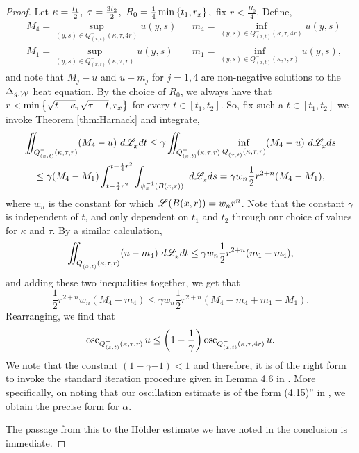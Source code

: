 \documentclass[a4paper, 12pt]{amsart}
\begin{document}
\begin{proof}
Let 
$\kappa = \frac{t_1}{2},\ \tau = \frac{3t_2}{2},\ R_0 = \frac{1}{4} \min\left\{t_1, r_x\right\},$ fix $r < \frac{R_0}{4}$.
Define, 
\begin{align*}
&M_4 = \sup_{(y,s) \in Q^{-}_{(x,t)}(\kappa, \tau, 4r)} u(y,s) &&m_4 = \inf_{(y,s) \in Q^{-}_{(x,t)}(\kappa, \tau, 4r)} u(y,s) \\
&M_1 = \sup_{(y,s) \in Q^{-}_{(x,t)}(\kappa, \tau, r)} u(y,s) &&m_1 = \inf_{(y,s) \in Q^{-}_{(x,t)}(\kappa, \tau, r)} u(y,s), 
\end{align*} 
and note that $M_j - u$ and $u - m_j$ for $j = 1, 4$ are non-negative
solutions to the $\Delta_{g,\mathcal{W}}$ heat equation.
By the choice of $R_0$,
we always have that $r < \min\left\{ \sqrt{t - \kappa}, \sqrt{\tau - t}, r_x\right\}$
for every $t \in [t_1, t_2]$. 
So, fix such a $t \in [t_1, t_2]$ we invoke Theorem \ref{thm:Harnack} and integrate,
\begin{multline*}
\iint_{Q^-_{(x,t)}(\kappa,\tau,r)} (M_4 - u)\ d\Leb_x dt 
	\leq \gamma \iint_{Q^-_{(x,t)}(\kappa,\tau,r)} \inf_{Q^+_{(x,t)}(\kappa, \tau, r)} (M_4 - u)\ d\Leb_x ds \\
	\leq \gamma (M_4 - M_1) \int_{t- \frac{3}{4}r^2}^{t - \frac{1}{4}r^2} \int_{\psi_x^{-1}(B(x,r))}\ d\Leb_x ds
	= \gamma w_n  \frac{1}{2}r^{2+n} (M_4 - M_1),$$
\end{multline*}
where $w_n$ is the constant for which $\mathscr{L}^{{}}(B(x,r)) = w_n r^n$.
Note that the constant $\gamma$ is independent of $t$, and only 
dependent on $t_1$ and $t_2$ through our choice
of values for $\kappa$ and $\tau$. 
By a similar calculation, 
$$
\iint_{Q^-_{(x,t)}(\kappa,\tau,r)} (u - m_4)\ d\Leb_x dt \leq \gamma w_n \frac{1}{2}r^{2+n} (m_1 - m_4),$$
and adding these two inequalities together, 
we get that
$$
\frac{1}{2}r^{2+n} w_n (M_4 - m_4) \leq \gamma w_n \frac{1}{2}r^{2+n} (M_4 - m_4 +m_1 - M_1).$$
Rearranging, we find that 
$$
\operatorname{osc}_{Q^{-}_{(x,t)}(\kappa, \tau, r)} u \leq \left(1 - \frac{1}{\gamma}\right) \operatorname{osc}_{Q^{-}_{(x,t)}(\kappa, \tau, 4r)} u.$$
We note that the constant $(1 - \gamma{-1}) < 1$
and therefore, it is of the right form to invoke the
standard iteration procedure given in Lemma 4.6 in \cite{Lieberman}. 
More specifically, on noting that
our oscillation estimate is of the form (4.15)'' in \cite{Lieberman},
we obtain the precise form for $\alpha$.

The passage from this to the Hölder estimate
we have noted in the conclusion is immediate. 
\end{proof}

\printbibliography
\end{document}
